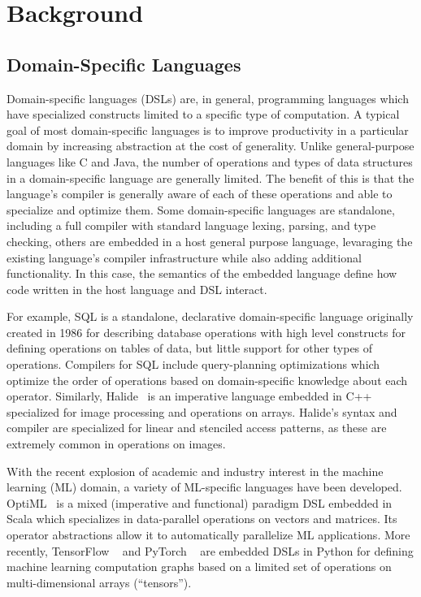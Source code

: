 \chapter{Background}
\label{background}

\section{Domain-Specific Languages}
Domain-specific languages (DSLs) are, in general, programming languages which have specialized
constructs limited to a specific type of computation. A typical goal of
most domain-specific languages is to improve productivity in a particular domain
by increasing abstraction at the cost of generality. Unlike general-purpose languages like C and Java,
the number of operations and types of data structures in a domain-specific language
are generally limited. The benefit of this is that the language's compiler is
generally aware of each of these operations and able to specialize and optimize them.
Some domain-specific languages are standalone, including a full compiler with standard language
lexing, parsing, and type checking, others are embedded in a host general purpose language,
levaraging the existing language's compiler infrastructure while also
adding additional functionality. In this case, the semantics of the embedded language
define how code written in the host language and DSL interact.

For example, SQL is a standalone, declarative
domain-specific language originally created in 1986 for describing database operations with high level constructs
for defining operations on tables of data, but little support for other types of operations.
Compilers for SQL include query-planning optimizations which optimize the order of
operations based on domain-specific knowledge about each operator.
Similarly, Halide~\cite{pldi13halide} is an imperative language embedded in C++ specialized for image processing
and operations on arrays. Halide's syntax and compiler are specialized for linear and stenciled access patterns,
as these are extremely common in operations on images.

With the recent explosion of academic and industry interest in the machine learning (ML) domain,
a variety of ML-specific languages have been developed.
OptiML~\cite{optiml} is a mixed (imperative and functional) paradigm DSL embedded in Scala
which specializes in data-parallel operations on vectors and matrices.
Its operator abstractions allow it to automatically parallelize ML applications.
More recently, TensorFlow ~\cite{tensorflow} and PyTorch ~\cite{pytorch} are
embedded DSLs in Python for defining machine learning computation graphs based on
a limited set of operations on multi-dimensional arrays (``tensors'').

